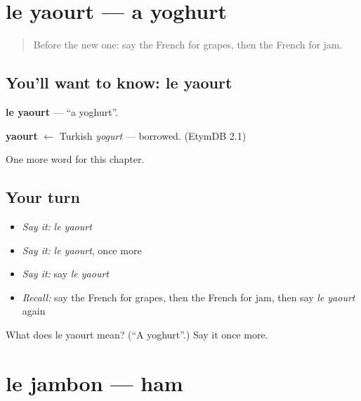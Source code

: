 \section[le yaourt]{le yaourt — a yoghurt}

\label{lesson:FR-C71-yaourt}



\begin{quote}
Before the new one: say the French for grapes, then the French for jam.
\end{quote}

\subsection*{You'll want to know: le yaourt}
\textbf{le yaourt} — \textquotedblleft{}a yoghurt\textquotedblright{}.

\begin{cousinweb}
\textbf{yaourt} $\leftarrow$ Turkish \emph{yogurt} — borrowed. (EtymDB 2.1)
\end{cousinweb}

\begin{grammarlens}[title={What you've built}]
One more word for this chapter.
\end{grammarlens}

\subsection*{Your turn}
\begin{itemize}
\raggedright
  \item \emph{Say it:} \emph{le yaourt}
  \item \emph{Say it:} \emph{le yaourt}, once more
  \item \emph{Say it:} say \emph{le yaourt}
  \item \emph{Recall:} say the French for grapes, then the French for jam, then say \emph{le yaourt} again
\end{itemize}

\begin{tcolorbox}[breakable,colback=teal!4,colframe=teal!35!black,title={Before you move on}]
What does le yaourt mean? (\textquotedblleft{}A yoghurt\textquotedblright{}.) Say it once more.
\end{tcolorbox}
\section[le jambon]{le jambon — ham}


